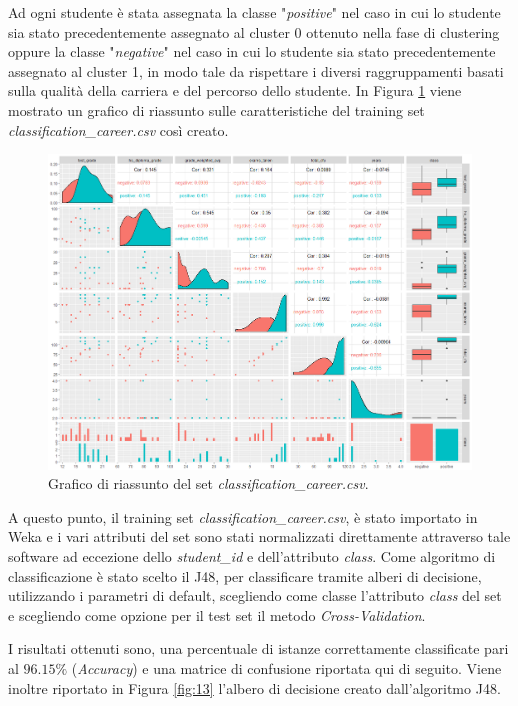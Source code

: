 \documentclass[]{article}
\begin{document}
Ad ogni studente \`{e} stata assegnata la classe "\textit{positive}" nel caso in cui lo studente sia stato precedentemente assegnato al cluster 0 ottenuto nella fase di clustering oppure la classe "\textit{negative}" nel caso in cui lo studente sia stato precedentemente assegnato al cluster 1, in modo tale da rispettare i diversi raggruppamenti basati sulla qualit\`{a} della carriera e del percorso dello studente. In Figura \ref{fig:12} viene mostrato un grafico di riassunto sulle caratteristiche del training set \textit{classification\_career.csv} cos\`{i} creato.

\begin{figure}[t]
	\centering
	\includegraphics[scale=0.35]{Img/summary_class_plot.png}
	\caption{Grafico di riassunto del set \textit{classification\_career.csv}.
		\label{fig:12}}
\end{figure} 

A questo punto, il training set \textit{classification\_career.csv}, \`{e} stato importato in Weka e i vari attributi del set sono stati normalizzati direttamente attraverso tale software ad eccezione dello \textit{student\_id} e dell'attributo \textit{class}. Come algoritmo di classificazione \`{e} stato scelto il J48, per classificare tramite alberi di decisione, utilizzando i parametri di default, scegliendo come classe l'attributo \textit{class} del set e scegliendo come opzione per il test set il metodo \textit{Cross-Validation}.

I risultati ottenuti sono, una percentuale di istanze correttamente classificate pari al $96.15\%$ (\textit{Accuracy}) e una matrice di confusione riportata qui di seguito. Viene inoltre riportato in Figura \ref{fig:13} l'albero di decisione creato dall'algoritmo J48.
\end{document}
